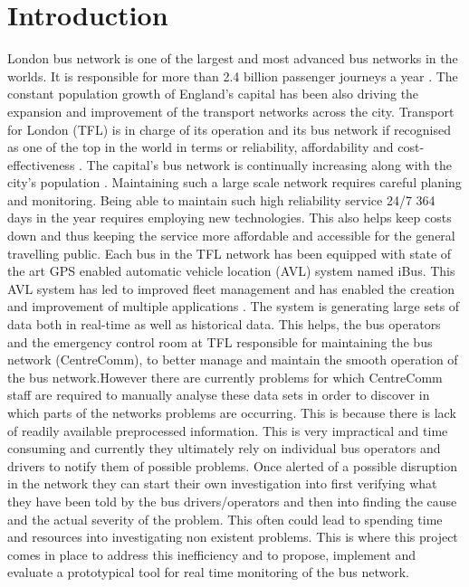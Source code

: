 \chapter{Introduction}
London bus network is one of the largest and most advanced bus networks in the worlds. It is responsible for more than 2.4 billion passenger journeys a year \cite{TFL1}. The constant population growth of England's capital has been also driving the expansion and improvement of the transport networks across the city. Transport for London (TFL) is in charge of its operation and its bus network if recognised as one of the top in the world in terms or reliability, affordability and cost-effectiveness \cite{TFL1}. The capital's bus network is continually increasing along with the city's population \cite{TFL2}. 
Maintaining such a large scale network requires careful planing and monitoring. Being able to maintain such high reliability service 24/7 364 days in the year requires employing new technologies. This also helps keep costs down and thus keeping the service more affordable and accessible for the general travelling public. Each bus in the TFL network has been equipped with state of the art GPS enabled automatic vehicle location (AVL) system named iBus\cite{ibusdeployment}. This AVL system has led to improved fleet management and has enabled the creation and improvement of multiple applications \cite{eps354267}.
The system is generating large sets of data both in real-time as well as historical data. This helps, the bus operators and the emergency control room at TFL responsible for maintaining the bus network (CentreComm), to better manage and maintain the smooth operation of the bus network.However there are currently problems for which CentreComm staff are required to manually analyse these data sets in order to discover in which parts of the networks problems are occurring. This is because there is lack of readily available preprocessed information. This is very impractical and time consuming and currently they ultimately rely on individual bus operators and drivers to notify them of possible problems. Once alerted of a possible disruption in the network they can start their own investigation into first verifying what they have been told by the bus drivers/operators and then into finding the cause and the actual severity of the problem. This often could lead to spending time and resources into investigating non existent problems. This is where this project comes in place to address this inefficiency and to propose, implement and evaluate a prototypical tool for real time monitoring of the bus network.

